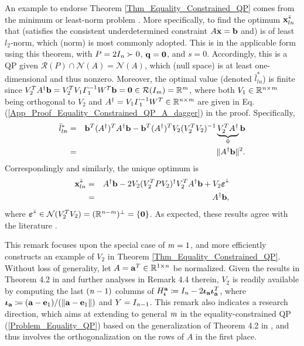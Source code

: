 \documentclass{imaman}
\newcommand{\beq}{\begin{eqnarray}}
\newcommand{\eeq}{\end{eqnarray}}
\newcommand{\bfa}{{\bf a}}
\newcommand{\bfb}{{\bf b}}
\newcommand{\bfx}{{\bf x}}
\newcommand{\bfq}{{\bf q}}
\newcommand{\bfe}{{\bf e}}
\newcommand{\bfiota}{{\boldsymbol \iota}}
\newcommand{\bfvarepsilon}{{\boldsymbol \varepsilon}}
\newcommand{\bfzero}{{\bf 0}}
\newcommand{\real}{\mathbb{R}}
\newcommand{\calN}{{\mathcal N}}
\newcommand{\calR}{{\mathcal R}}
\newcommand{\itm}{{\it m}}
\newcommand{\itn}{{\it n}}
\numberwithin{equation}{section}
\begin{document}
\begin{remark}
An example to endorse Theorem \ref{Thm_Equality_Constrained_QP} comes from the minimum or least-norm problem \cite{BoVa:04,GoVa:13}. More specifically, to find the optimum $\bfx^{\bar *}_{ln}$ that (satisfies the consistent underdetermined constraint $A\bfx=\bfb$ and) is of least $l_2$-norm, which (norm) is most commonly adopted. This is in the applicable form using this theorem, with $P=2I_\itn\succ 0$, $\bfq=\bfzero$, and $s=0$. Accordingly, this is a QP given $\calR(P)\cap\calN(A)=\calN(A)$, which (null space) is at least one-dimensional and thus nonzero. Moreover, the optimal value (denoted $\bar l^*_{ln}$) is finite since $V_2^TA^\dagger\bfb=V_2^TV_1\Gamma_1^{-1}W^T\bfb=\bfzero\in\calR(I_{\itm})=\real^\itm$, where both $V_1\in\real^{\itn\times\itm}$ being orthogonal to $V_2$ and $A^\dagger=V_1\Gamma_1^{-1}W^T\in\real^{\itn\times\itm}$ are given in Eq. (\ref{App_Proof_Equality_Constrained_QP_A_dagger}) in the proof. Specifically,
\beq
\bar l^*_{ln}&=&\bfb^T(A^\dagger)^TA^\dagger\bfb-\bfb^T(A^\dagger)^TV_2(V_2^TV_2)^{-1} \underbrace{V_2^TA^\dagger}_\text{$0$}\bfb\nonumber\\
&=&\Vert A^\dagger\bfb\Vert^2.\nonumber
\eeq
Correspondingly and similarly, the unique optimum is
\beq
\bfx^{\bar *}_{ln}&=&A^\dagger\bfb-2V_2(V_2^TPV_2)^\dagger V_2^TA^\dagger\bfb+V_2\bfvarepsilon^{\bar *}\nonumber\\
&=&A^\dagger\bfb,
\eeq
where $\bfvarepsilon^{\bar *}\in\calN(V_2^TV_2)=(\real^{\itn-\itm})^\perp=\{\bfzero\}$. As expected, these results agree with the literature \cite{BoVa:04}.
\label{Rem_Least_Norm}
\end{remark}

\begin{remark}
This remark focuses upon the special case of $\itm=1$, and more efficiently constructs an example of $V_2$ in Theorem \ref{Thm_Equality_Constrained_QP}. Without loss of generality, let $A=\bfa^T\in\real^{1\times\itn}$ be normalized. Given the results in Theorem 4.2 in \cite{LiLiHs:20} and further analyses in Remark 4.4 therein, $V_2$ is readily available by computing the last $(\itn-1)$ columns of $H_\bfiota^\bfa\coloneqq I_\itn-2\bfiota_\bfa\bfiota_\bfa^T$, where $\bfiota_\bfa\coloneqq (\bfa-\bfe_1)/(\Vert\bfa-\bfe_1\Vert)$ and $Y=I_{\itn-1}$. This remark also indicates a research direction, which aims at extending to general $\itm$ in the equality-constrained QP (\ref{Problem_Equality_QP}) based on the generalization of Theorem 4.2 in \cite{LiLiHs:20}, and thus involves the orthogonalization on the rows of $A$ in the first place.
\label{Rem_Thm_Equality_Constrained_QP_m_1}
\end{remark}
\end{document}
